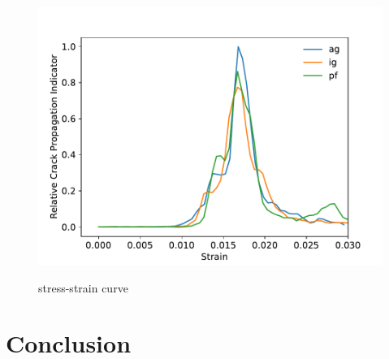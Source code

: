 \documentclass[times,12pt]{elsarticle}
\begin{document}
\begin{figure}[h]
	\centering
	\includegraphics[width=0.7\linewidth]{img/1stdiv}
	\label{fig:surf}
	\caption{stress-strain curve}
\end{figure}


\section{Conclusion}
%


\end{document}
